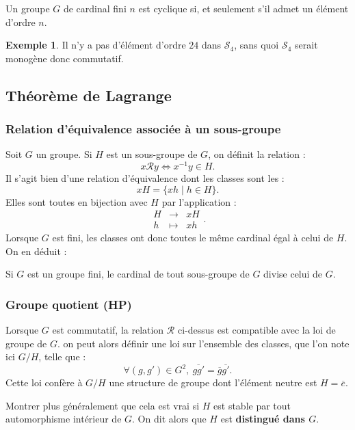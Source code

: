 \documentclass[french]{article}
\newcommand{\inv}{^{-1}}
\theoremstyle{plain}
\theoremstyle{definition}
\newtheorem*{ex}{Exemple}
\theoremstyle{remark}
\begin{document}
\begin{prop}%
	Un groupe $G$ de cardinal fini $n$ est cyclique si, et seulement s'il admet un élément d'ordre $n$.
\end{prop}

\begin{ex}
	Il n'y a pas d'élément d'ordre $24$ dans $\mathcal{S}_4$, sans quoi $\mathcal{S}_4$ serait monogène donc commutatif.
\end{ex}

\subsection{Théorème de Lagrange}

\subsubsection*{Relation d'équivalence associée à un sous-groupe}

Soit $G$ un groupe. Si $H$ est un sous-groupe de $G$, on définit la relation :
$$x\mathcal{R}y\iff x\inv y\in H.$$
Il s'agit bien d'une relation d'équivalence dont les classes sont les :
$$xH=\{xh\mid h\in H\}.$$
Elles sont toutes en bijection avec $H$  par l'application :
$$\begin{array}{rcl}
	H&\longrightarrow&xH\\
	h&\longmapsto&xh
\end{array}.$$
Lorsque $G$ est fini, les classes ont donc toutes le même cardinal égal à celui de $H$. On en déduit :

\begin{thm}%
	Si $G$ est un groupe fini, le cardinal de tout sous-groupe de $G$ divise celui de $G$.
\end{thm}

\subsubsection*{Groupe quotient (HP)}

Lorsque $G$ est commutatif, la relation $\mathcal{R}$ ci-dessus est compatible avec la loi de groupe de $G$. on peut alors définir une loi sur l'ensemble des classes, que l'on note ici $G/H$, telle que :
$$\forall (g,g')\in G^2,\ \overline{gg'}=\overline{g}\overline{g'}.$$
Cette loi confère à $G/H$ une structure de groupe dont l'élément neutre est $H=\overline{e}$.

\begin{exo}
	Montrer plus généralement que cela est vrai si $H$ est stable par tout automorphisme intérieur de $G$. On dit alors que $H$ est \textbf{distingué dans $G$}.
\end{exo}
\end{document}
